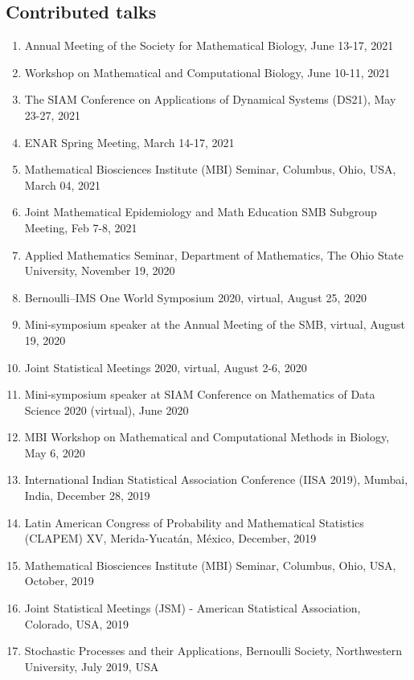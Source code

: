 \documentclass[11pt,a4paper,sans]{moderncv}        %
\begin{document}
\subsection{Contributed talks}
\begin{enumerate}
	\item Annual Meeting of the Society for Mathematical Biology, June 13-17, 2021
	\item Workshop on Mathematical and Computational Biology, June 10-11, 2021
	\item The SIAM Conference on Applications of Dynamical Systems (DS21), May 23-27, 2021
    	\item ENAR Spring Meeting, March 14-17, 2021
	\item Mathematical Biosciences Institute (MBI) Seminar, Columbus, Ohio, USA, March 04, 2021
	\item Joint Mathematical Epidemiology and Math Education SMB Subgroup Meeting, Feb 7-8, 2021
	\item Applied Mathematics Seminar, Department of Mathematics, The Ohio State University, November 19, 2020 
	\item Bernoulli--IMS One World Symposium 2020, virtual, August 25, 2020
	\item Mini-symposium speaker at the Annual Meeting of the SMB, virtual, August 19, 2020
	\item Joint Statistical Meetings 2020, virtual, August 2-6, 2020
	\item {Mini-symposium speaker at SIAM Conference on Mathematics of Data Science 2020 (virtual), June 2020}
	\item {MBI Workshop on Mathematical and Computational Methods in Biology, May 6, 2020}
	\item {International Indian Statistical Association Conference (IISA 2019), Mumbai, India, December 28, 2019}
	\item {Latin American Congress of Probability and Mathematical Statistics (CLAPEM) XV, Merida-Yucatán, México, December, 2019}
	\item {Mathematical Biosciences Institute (MBI) Seminar, Columbus, Ohio, USA, October, 2019}
	\item{Joint Statistical Meetings (JSM) - American Statistical Association, Colorado, USA, 2019} 
	\item{Stochastic Processes and their Applications, Bernoulli Society, Northwestern University, July 2019, USA}

\end{enumerate}
\end{document}
